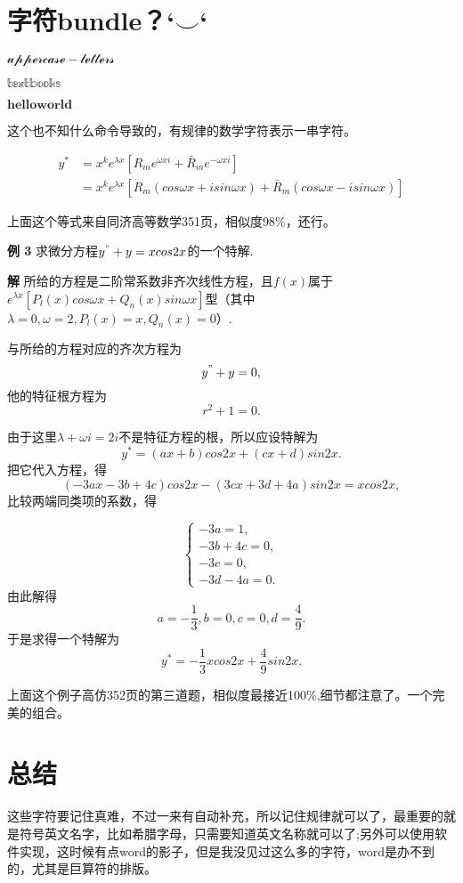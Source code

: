 \documentclass[10pt,a4paper]{article}
\begin{document}
	\section{字符bundle？`$\smile$`}
	$\mathcal{uppercase-letters}$
	
	$\mathbb{textbooks}$
	
	$\mathbf{helloworld}$
	
	这个也不知什么命令导致的，有规律的数学字符表示一串字符。
	
	\begin{align}
	y^*&=x^ke^{\lambda x} [R_me^{\omega xi}+\bar R_me^{-\omega xi}] \\
	&=x^ke^{\lambda x}[R_m(cos \omega x+isin \omega x)+\bar R_m(cos \omega x-isin \omega x)]
	\end{align}
	
	上面这个等式来自同济高等数学351页，相似度98\%，还行。
	
	\textbf{例 3}	求微分方程$y^{"}+y=xcos2x$的一个特解.%
	
	\textbf{解}	所给的方程是二阶常系数非齐次线性方程，且$f(x)$属于$e^{\lambda x}[P_l(x)cos \omega x+Q_n(x)sin\omega x]$型（其中$\lambda=0,\omega=2,P_l(x)=x,Q_n(x)=0$）.
	
	与所给的方程对应的齐次方程为$$y^"+y=0,$$
	他的特征根方程为$$r^2+1=0.$$
	
	由于这里$\lambda +\omega i=2i$不是特征方程的根，所以应设特解为$$y^*=(ax+b)cos2x+(cx+d)sin2x.$$
	把它代入方程，得$$(-3ax-3b+4c)cos2x-(3cx+3d+4a)sin2x=xcos2x,$$
	比较两端同类项的系数，得
	
	$$\begin{cases}
		-3a=1,\\
		-3b+4c=0,\\
		-3c=0,\\
		-3d-4a=0.
	\end{cases}$$
	由此解得$$a=-\frac{1}{3},b=0,c=0,d=\frac49.$$
	于是求得一个特解为$$y^*=-\frac13xcos2x+\frac49sin2x.$$
	
	上面这个例子高仿352页的第三道题，相似度最接近100\%,细节都注意了。一个完美的组合。
	
	\section{总结}
	这些字符要记住真难，不过一来有自动补充，所以记住规律就可以了，最重要的就是符号英文名字，比如希腊字母，只需要知道英文名称就可以了;另外可以使用软件实现，这时候有点word的影子，但是我没见过这么多的字符，word是办不到的，尤其是巨算符的排版。
\end{document}
